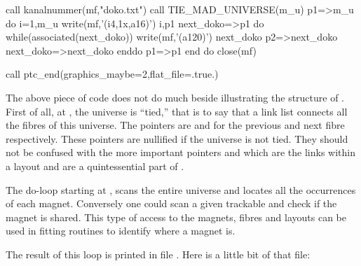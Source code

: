  
{ 
\begin{ptccode}
call kanalnummer(mf,"doko.txt")
call TIE_MAD_UNIVERSE(m_u)    \label{lin:tie:uni}
p1=>m_u%
do i=1,m_u%
 write(mf,'(i4,1x,a16)') i,p1%
 next_doko=>p1%
  do while(associated(next_doko))
   write(mf,'(a120)') next_doko%
   p2=>next_doko%
   next_doko=>next_doko%
 enddo
 p1=>p1%
end do
close(mf)

call ptc_end(graphics_maybe=2,flat_file=.true.)  \label{lin:ptc:end}
                                  
\end{ptccode}
}

The above piece of code does not do much beside illustrating the structure  of \PTC . First of all, at , the universe  is ``tied,'' that is to say that a link list connects all the fibres of this universe. The pointers are  and  for the previous and next fibre respectively. These pointers are nullified if the universe is not tied. They should not be confused with the more important pointers  and   which are the links within a layout and are a quintessential part of \PTC .

The do-loop starting at , scans the entire universe and locates all the occurrences of each magnet. Conversely one could scan a given trackable and check if the magnet is shared. This type of access to the magnets, fibres and layouts can be used in fitting routines to identify where a magnet is.

The result of this loop is printed in file . Here is a little bit of that file:

